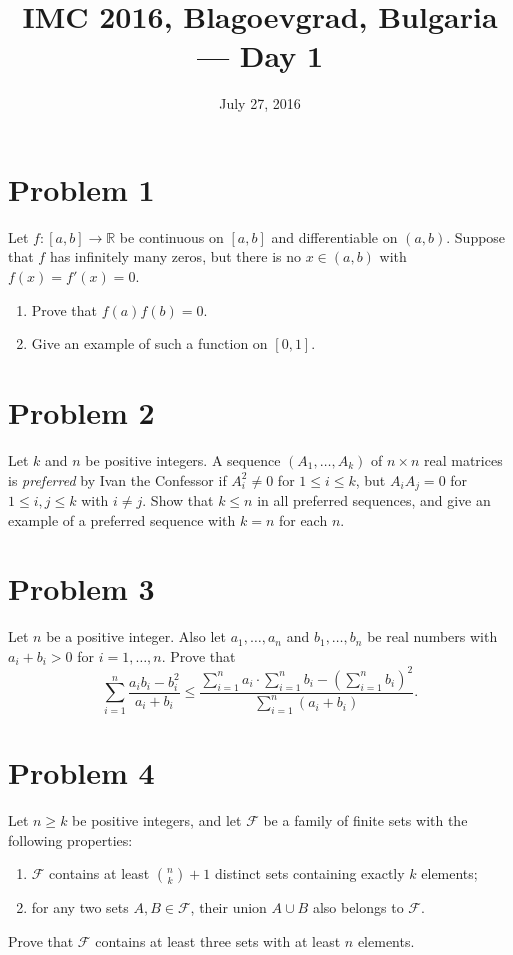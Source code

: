 \documentclass{article}
\title{IMC 2016, Blagoevgrad, Bulgaria --- Day 1}
\date{July 27, 2016}
\begin{document}
\maketitle

\section*{Problem 1}
Let $f : [a, b] \to \mathbb{R}$ be continuous on $[a,b]$ and differentiable on $(a,b)$. Suppose that $f$ has infinitely many zeros, but there is no $x \in (a,b)$ with $f(x) = f'(x) = 0$.
\begin{enumerate}
\item[(a)] Prove that $f(a) f(b) = 0$.
\item[(b)] Give an example of such a function on $[0,1]$.
\end{enumerate}

\section*{Problem 2}
Let $k$ and $n$ be positive integers. A sequence $(A_1, \dots, A_k)$ of $n \times n$ real matrices is \emph{preferred} by Ivan the Confessor if $A_i^2 \ne 0$ for $1 \le i \le k$, but $A_i A_j = 0$ for $1 \le i, j \le k$ with $i \ne j$. Show that $k \le n$ in all preferred sequences, and give an example of a preferred sequence with $k = n$ for each $n$.

\section*{Problem 3}
Let $n$ be a positive integer. Also let $a_1, \dots, a_n$ and $b_1, \dots, b_n$ be real numbers with $a_i + b_i > 0$ for $i = 1, \dots, n$. Prove that
\[ \sum_{i=1}^n \frac{a_i b_i - b_i^2}{a_i + b_i} \le \frac{\sum_{i=1}^n a_i \cdot \sum_{i=1}^n b_i - \left(\sum_{i=1}^n b_i\right)^2}{\sum_{i=1}^n (a_i + b_i)}. \]

\section*{Problem 4}
Let $n \ge k$ be positive integers, and let $\mathcal{F}$ be a family of finite sets with the following properties:
\begin{enumerate}
\item[(i)] $\mathcal{F}$ contains at least $\binom{n}{k}+1$ distinct sets containing exactly $k$ elements;
\item[(ii)] for any two sets $A, B \in \mathcal{F}$, their union $A \cup B$ also belongs to $\mathcal{F}$.
\end{enumerate}
Prove that $\mathcal{F}$ contains at least three sets with at least $n$ elements.
\end{document}
